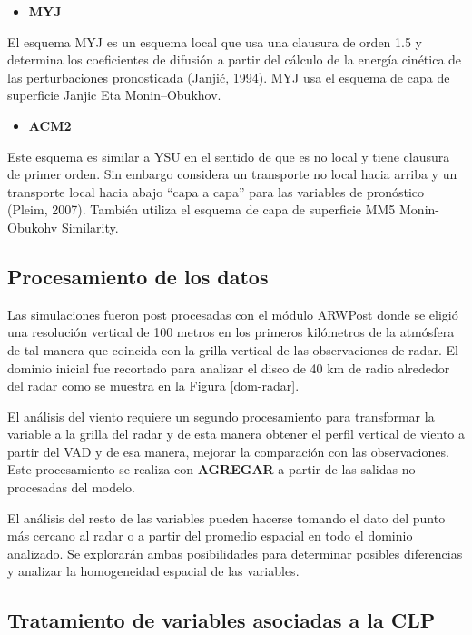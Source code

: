 \documentclass[12pt,spanish,oneside]{book}
\providecommand{\tightlist}{%
  \setlength{\itemsep}{0pt}\setlength{\parskip}{0pt}}
\begin{document}
\begin{itemize}
\tightlist
\item
  \textbf{MYJ}
\end{itemize}

El esquema MYJ es un esquema local que usa una clausura de orden 1.5 y
determina los coeficientes de difusión a partir del cálculo de la
energía cinética de las perturbaciones pronosticada (Janjić, 1994). MYJ
usa el esquema de capa de superficie Janjic Eta Monin--Obukhov.

\begin{itemize}
\tightlist
\item
  \textbf{ACM2}
\end{itemize}

Este esquema es similar a YSU en el sentido de que es no local y tiene
clausura de primer orden. Sin embargo considera un transporte no local
hacia arriba y un transporte local hacia abajo ``capa a capa'' para las
variables de pronóstico (Pleim, 2007). También utiliza el esquema de
capa de superficie MM5 Monin-Obukohv Similarity.

\subsection{Procesamiento de los
datos}\label{procesamiento-de-los-datos}

Las simulaciones fueron post procesadas con el módulo ARWPost donde se
eligió una resolución vertical de 100 metros en los primeros kilómetros
de la atmósfera de tal manera que coincida con la grilla vertical de las
observaciones de radar. El dominio inicial fue recortado para analizar
el disco de 40 km de radio alrededor del radar como se muestra en la
Figura \ref{dom-radar}.

El análisis del viento requiere un segundo procesamiento para
transformar la variable a la grilla del radar y de esta manera obtener
el perfil vertical de viento a partir del VAD y de esa manera, mejorar
la comparación con las observaciones. Este procesamiento se realiza con
\textbf{AGREGAR} a partir de las salidas no procesadas del modelo.

El análisis del resto de las variables pueden hacerse tomando el dato
del punto más cercano al radar o a partir del promedio espacial en todo
el dominio analizado. Se explorarán ambas posibilidades para determinar
posibles diferencias y analizar la homogeneidad espacial de las
variables.

\subsection{Tratamiento de variables asociadas a la
CLP}\label{tratamiento-de-variables-asociadas-a-la-clp}
\end{document}

